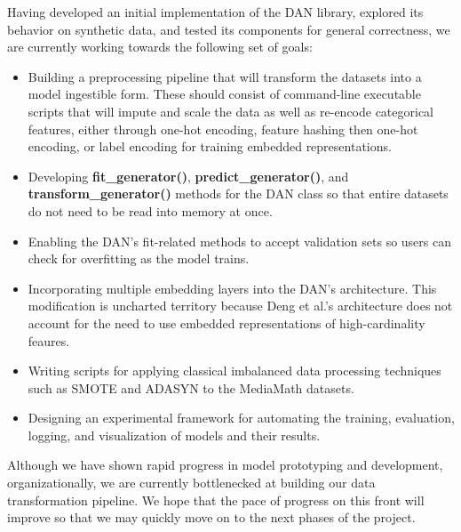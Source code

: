 \documentclass{proc}
\begin{document}
Having developed an initial implementation of the DAN library, explored its behavior on synthetic data, and tested its components for general correctness, we are currently working towards the following set of goals:

\begin{itemize}
\item{Building a preprocessing pipeline that will transform the datasets into a model ingestible form. These should consist of command-line executable scripts that will impute and scale the data as well as re-encode categorical features, either through one-hot encoding, feature hashing then one-hot encoding, or label encoding for training embedded representations.}
\item{Developing \textbf{fit\_generator()}, \textbf{predict\_generator()}, and \textbf{transform\_generator()} methods for the DAN class so that entire datasets do not need to be read into memory at once.}
\item{Enabling the DAN's fit-related methods to accept validation sets so users can check for overfitting as the model trains.}
\item{Incorporating multiple embedding layers into the DAN's architecture. This modification is uncharted territory because Deng et al.'s architecture does not account for the need to use embedded representations of high-cardinality feaures.}
\item{Writing scripts for applying classical imbalanced data processing techniques such as SMOTE and ADASYN to the MediaMath datasets.}
\item{Designing an experimental framework for automating the training, evaluation, logging, and visualization of models and their results.}
\end{itemize}

Although we have shown rapid progress in model prototyping and development, organizationally, we are currently bottlenecked at building our data transformation pipeline. We hope that the pace of progress on this front will improve so that we may quickly move on to the next phases of the project.
\end{document}
